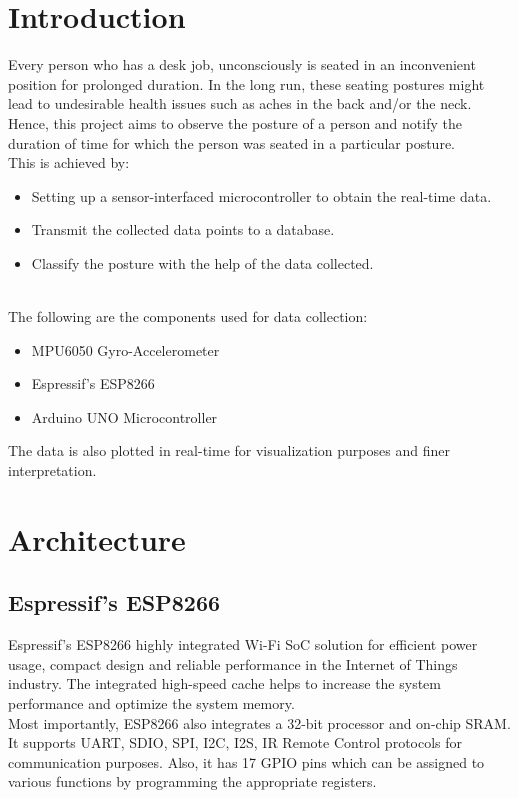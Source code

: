\documentclass{report}
\begin{document}
\chapter{Introduction}

Every person who has a desk job, unconsciously is seated in an inconvenient position for prolonged duration. In the long run, these seating postures might lead to undesirable health issues such as aches in the back and/or the neck.  
Hence, this project aims to observe the posture of a person and notify the duration of time for which the person was seated in a particular posture.
\\
This is achieved by:
\begin{itemize}
    \item Setting up a sensor-interfaced microcontroller to obtain the real-time data.
    \item Transmit the collected data points to a database.
    \item Classify the posture with the help of the data collected.
\end{itemize} \\
The following are the components used for data collection:
\begin{itemize}
    \item MPU6050 Gyro-Accelerometer
    \item Espressif's ESP8266 
    \item Arduino UNO Microcontroller
\end{itemize}

The data is also plotted in real-time for visualization purposes and finer interpretation. 

\chapter{Architecture}
\section{Espressif's ESP8266}

Espressif’s ESP8266 highly integrated Wi-Fi SoC solution for efficient power usage, compact design and reliable performance in the Internet of Things industry. The integrated high-speed cache helps to increase the system performance and optimize the system memory. \\ 
Most importantly, ESP8266 also integrates a 32-bit processor and on-chip SRAM.
It supports UART, SDIO, SPI, I2C, I2S, IR Remote Control protocols for communication purposes.
Also, it has 17 GPIO pins which can be assigned to various functions by programming the appropriate registers.
\end{document}
